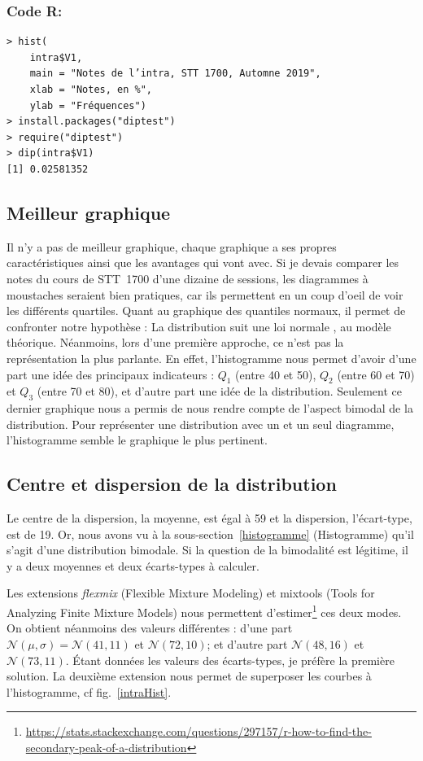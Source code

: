 \documentclass[10pt,twocolumn]{article}
\begin{document}
\subsubsection*{Code R:}
\begin{verbatim}
> hist(
    intra$V1,
    main = "Notes de l’intra, STT 1700, Automne 2019",
    xlab = "Notes, en %",
    ylab = "Fréquences")
> install.packages("diptest")
> require("diptest")
> dip(intra$V1)
[1] 0.02581352
\end{verbatim}


\subsection{Meilleur graphique}
Il n’y a pas de meilleur graphique, chaque graphique a ses propres caractéristiques ainsi que les avantages qui vont avec. Si je devais comparer les notes du cours de STT~1700 d’une dizaine de sessions, les diagrammes à moustaches seraient bien pratiques, car ils permettent en un coup d’oeil de voir les différents quartiles. Quant au graphique des quantiles normaux, il permet de confronter notre hypothèse : \og La distribution suit une loi normale \fg{}, au modèle théorique. Néanmoins, lors d’une première approche, ce n’est pas la représentation la plus parlante. En effet, l’histogramme nous permet d’avoir d’une part une idée des principaux indicateurs : $Q_{1}$ (entre 40 et 50), $Q_{2}$ (entre 60 et 70) et $Q_{3}$ (entre 70 et 80), et d’autre part une idée de la distribution. Seulement ce dernier graphique nous a permis de nous rendre compte de l’aspect bimodal de la distribution. Pour représenter une distribution avec un et un seul diagramme, l’histogramme semble le graphique le plus pertinent.


\subsection{Centre et dispersion de la distribution}
Le centre de la dispersion, la moyenne, est égal à 59 et la dispersion, l’écart-type, est de 19. Or, nous avons vu à la sous-section~\ref{histogramme} (Histogramme) qu’il s’agit d’une distribution bimodale. Si la question de la bimodalité est légitime, il y a deux moyennes et deux écarts-types à calculer.

Les extensions \textit{flexmix} (Flexible Mixture Modeling) et mixtools (Tools for Analyzing Finite Mixture Models) nous permettent d’estimer\footnote{\url{https://stats.stackexchange.com/questions/297157/r-how-to-find-the-secondary-peak-of-a-distribution}} ces deux modes. On obtient néanmoins des valeurs différentes : d’une part $\mathcal{N}(\mu,\sigma) = \mathcal{N}(41,11)$ et $\mathcal{N}(72,10)$; et d’autre part $\mathcal{N}(48,16)$ et $\mathcal{N}(73,11)$. Étant données les valeurs des écarts-types, je préfère la première solution. La deuxième extension nous permet de superposer les courbes à l’histogramme, cf fig.~\ref{intraHist}.
\end{document}

